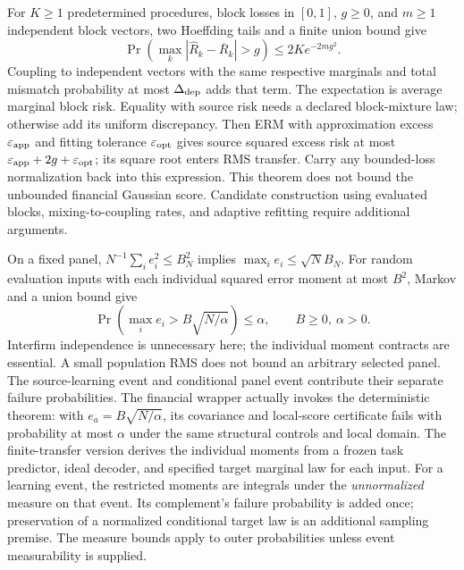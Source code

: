 \documentclass[11pt]{article}
\renewcommand{\lean}[1]{\ignorespaces}
\renewcommand{\leanok}{\ignorespaces}
\begin{document}
For $K\ge1$ predetermined procedures, block losses in $[0,1]$, $g\ge0$,
and $m\ge1$ independent block vectors, two Hoeffding tails and a finite union
bound give
\begin{equation}\label{eq:block-concentration}
  \Pr\!\left(\max_k|\widehat R_k-\overline R_k|>g\right)
  \le2K e^{-2mg^2}.
\end{equation}
\lean{FreeFoundations.Selection.finite_family}\leanok{}
Coupling to independent vectors with the same respective marginals and total
mismatch probability at most $\Delta_{\rm dep}$ adds that term.
\lean{FreeFoundations.Selection.coupled_finite_family}\leanok{}
The expectation is average marginal block risk. Equality with source risk needs
a declared block-mixture law; otherwise add its uniform discrepancy. Then ERM
with approximation excess $\varepsilon_{\rm app}$ and fitting tolerance
$\varepsilon_{\rm opt}$ gives source squared excess risk at most
$\varepsilon_{\rm app}+2g+\varepsilon_{\rm opt}$; its square root enters RMS
transfer. Carry any bounded-loss normalization back into this expression.
\lean{FreeFoundations.Selection.source_excess}\leanok{}
This theorem does not bound the unbounded financial Gaussian score. Candidate
construction using evaluated blocks, mixing-to-coupling rates, and adaptive
refitting require additional arguments.

On a fixed panel, $N^{-1}\sum_i e_i^2\le B_N^2$ implies
$\max_i e_i\le\sqrt N B_N$. For random evaluation inputs with each individual
squared error moment at most $B^2$, Markov and a union bound give
\[
  \Pr\!\left(\max_i e_i>B\sqrt{N/\alpha}\right)\le\alpha,
  \qquad B\ge0,\ \alpha>0.
\]
\lean{FreeFoundations.GramDistance.empirical_rms_to_uniform,
FreeFoundations.Selection.random_panel}\leanok{}
Interfirm independence is unnecessary here; the individual moment contracts
are essential. A small population RMS does not bound an arbitrary selected
panel. The source-learning event and conditional panel event contribute their
separate failure probabilities.
The financial wrapper actually invokes the deterministic theorem: with
$e_a=B\sqrt{N/\alpha}$, its covariance and local-score certificate fails with
probability at most $\alpha$ under the same structural controls and
local domain.
The finite-transfer version derives the individual moments from a frozen task
predictor, ideal decoder, and specified target marginal law for each input.
\lean{FreeFoundations.StatisticalFinancial.failure_probability,
FreeFoundations.StatisticalFinancial.finite_transfer_failure_probability}\leanok{}
For a learning event, the restricted moments are integrals under the
\emph{unnormalized} measure on that event. Its complement's failure probability
is added once; preservation of a normalized conditional target law is an
additional sampling premise. The measure bounds apply to outer probabilities
unless event measurability is supplied.
\lean{FreeFoundations.StatisticalFinancial.failure_probability_with_learning}\leanok{}
\end{document}
